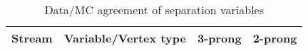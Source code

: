 \documentclass{article}
\begin{document}
\begin{longtable}{c|c|c|c}
\caption{\label{tab:sepVarsandSepPeriods}Data/MC agreement of separation variables}\\
Stream & Variable/Vertex type & 3-prong & 2-prong\\
\hline
\end{longtable}
\end{document}
